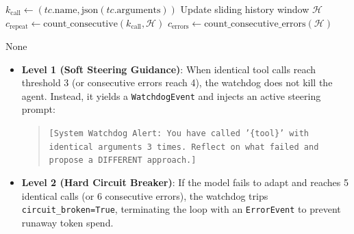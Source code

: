 \documentclass[10pt,twocolumn,letterpaper]{article}
\begin{document}
\begin{algorithm}[H]
\small
\SetAlgoLollipop
{}
$k_{\text{call}} \leftarrow (tc.\text{name}, \text{json}(tc.\text{arguments}))$\;
Update sliding history window $\mathcal{H}$\;
$c_{\text{repeat}} \leftarrow \text{count\_consecutive}(k_{\text{call}}, \mathcal{H})$\;
$c_{\text{errors}} \leftarrow \text{count\_consecutive\_errors}(\mathcal{H})$\;

\Return $\text{None}$\;
\caption{Progressive Two-Tier Watchdog Supervisor.}
\label{algo:watchdog}
\end{algorithm}

\begin{itemize}
    \item \textbf{Level 1 (Soft Steering Guidance)}: When identical tool calls reach threshold 3 (or consecutive errors reach 4), the watchdog does not kill the agent. Instead, it yields a \texttt{WatchdogEvent} and injects an active steering prompt:
    \begin{quote}
    \small \texttt{[System Watchdog Alert: You have called '\{tool\}' with identical arguments 3 times. Reflect on what failed and propose a DIFFERENT approach.]}
    \end{quote}
    \item \textbf{Level 2 (Hard Circuit Breaker)}: If the model fails to adapt and reaches 5 identical calls (or 6 consecutive errors), the watchdog trips \texttt{circuit\_broken=True}, terminating the loop with an \texttt{ErrorEvent} to prevent runaway token spend.
\end{itemize}
\end{document}
